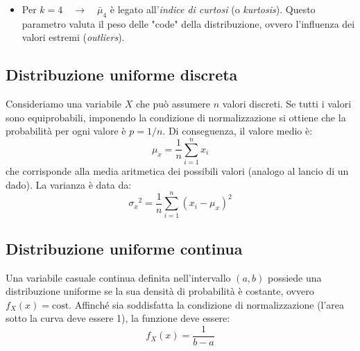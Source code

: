 \documentclass{article}
\theoremstyle{remark}
\begin{document}
\begin{itemize}
\begin{itemize}
        \item per una distribuzione asimmetrica a sinistra $\bar{\mu}_3<0$
    \begin{center}
        \end{center}

    \end{itemize}     

        \item Per $k=4 \quad \to \quad \bar{\mu}_4$ è legato all'\textit{indice di curtosi} (o \textit{kurtosis}). Questo parametro valuta il peso delle "code" della distribuzione, ovvero l'influenza dei valori estremi (\textit{outliers}).

\end{itemize}


\subsection{Distribuzione uniforme discreta}
Consideriamo una variabile $X$ che può assumere $n$ valori discreti. Se tutti i valori sono equiprobabili, imponendo la condizione di normalizzazione si ottiene che la probabilità per ogni valore è $p=1/n$.
Di conseguenza, il valore medio è:
\[
\mu_x=\frac{1}{n}\sum_{i=1}^{n}x_i
\]
che corrisponde alla media aritmetica dei possibili valori (analogo al lancio di un dado).
La varianza è data da:
\[
{\sigma_x}^2=\frac{1}{n} \sum_{i=1}^{n}(x_i-\mu_x)^2
\]


\subsection{Distribuzione uniforme continua}
Una variabile casuale continua definita nell'intervallo $(a,b)$ possiede una distribuzione uniforme se la sua densità di probabilità è costante, ovvero $f_X(x) = \text{cost}$.
Affinché sia soddisfatta la condizione di normalizzazione (l'area sotto la curva deve essere 1), la funzione deve essere:
\[
f_X(x)=\frac{1}{b-a}
\]
\end{document}
